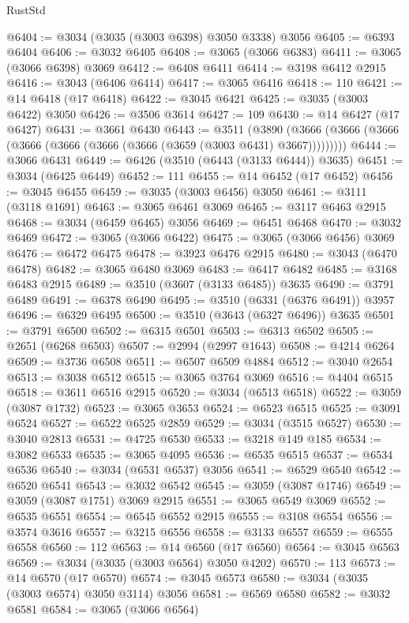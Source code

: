 \begin{lexlean}{RustStd}
\begin{coremodule}
@6404 := @3034 (@3035 (@3003 @6398) @3050 @3338) @3056
@6405 := @6393 @6404
@6406 := @3032 @6405
@6408 := @3065 (@3066 @6383)
@6411 := @3065 (@3066 @6398) @3069
@6412 := @6408 @6411
@6414 := @3198 @6412 @2915
@6416 := @3043 (@6406 @6414)
@6417 := @3065 @6416
@6418 := 110
@6421 := @14 @6418 (@17 @6418)
@6422 := @3045 @6421
@6425 := @3035 (@3003 @6422) @3050
@6426 := @3506 @3614
@6427 := 109
@6430 := @14 @6427 (@17 @6427)
@6431 := @3661 @6430
@6443 := @3511
    (@3890 (@3666 (@3666 (@3666 (@3666 (@3666 (@3666 (@3666 (@3659 (@3003 @6431) @3667)))))))))
@6444 := @3066 @6431
@6449 := @6426 (@3510 (@6443 (@3133 @6444)) @3635)
@6451 := @3034 (@6425 @6449)
@6452 := 111
@6455 := @14 @6452 (@17 @6452)
@6456 := @3045 @6455
@6459 := @3035 (@3003 @6456) @3050
@6461 := @3111 (@3118 @1691)
@6463 := @3065 @6461 @3069
@6465 := @3117 @6463 @2915
@6468 := @3034 (@6459 @6465) @3056
@6469 := @6451 @6468
@6470 := @3032 @6469
@6472 := @3065 (@3066 @6422)
@6475 := @3065 (@3066 @6456) @3069
@6476 := @6472 @6475
@6478 := @3923 @6476 @2915
@6480 := @3043 (@6470 @6478)
@6482 := @3065 @6480 @3069
@6483 := @6417 @6482
@6485 := @3168 @6483 @2915
@6489 := @3510 (@3607 (@3133 @6485)) @3635
@6490 := @3791 @6489
@6491 := @6378 @6490
@6495 := @3510 (@6331 (@6376 @6491)) @3957
@6496 := @6329 @6495
@6500 := @3510 (@3643 (@6327 @6496)) @3635
@6501 := @3791 @6500
@6502 := @6315 @6501
@6503 := @6313 @6502
@6505 := @2651 (@6268 @6503)
@6507 := @2994 (@2997 @1643)
@6508 := @4214 @6264
@6509 := @3736 @6508
@6511 := @6507 @6509 @4884
@6512 := @3040 @2654
@6513 := @3038 @6512
@6515 := @3065 @3764 @3069
@6516 := @4404 @6515
@6518 := @3611 @6516 @2915
@6520 := @3034 (@6513 @6518)
@6522 := @3059 (@3087 @1732)
@6523 := @3065 @3653
@6524 := @6523 @6515
@6525 := @3091 @6524
@6527 := @6522 @6525 @2859
@6529 := @3034 (@3515 @6527)
@6530 := @3040 @2813
@6531 := @4725 @6530
@6533 := @3218 @149 @185
@6534 := @3082 @6533
@6535 := @3065 @4095
@6536 := @6535 @6515
@6537 := @6534 @6536
@6540 := @3034 (@6531 @6537) @3056
@6541 := @6529 @6540
@6542 := @6520 @6541
@6543 := @3032 @6542
@6545 := @3059 (@3087 @1746)
@6549 := @3059 (@3087 @1751) @3069 @2915
@6551 := @3065 @6549 @3069
@6552 := @6535 @6551
@6554 := @6545 @6552 @2915
@6555 := @3108 @6554
@6556 := @3574 @3616
@6557 := @3215 @6556
@6558 := @3133 @6557
@6559 := @6555 @6558
@6560 := 112
@6563 := @14 @6560 (@17 @6560)
@6564 := @3045 @6563
@6569 := @3034 (@3035 (@3003 @6564) @3050 @4202)
@6570 := 113
@6573 := @14 @6570 (@17 @6570)
@6574 := @3045 @6573
@6580 := @3034 (@3035 (@3003 @6574) @3050 @3114) @3056
@6581 := @6569 @6580
@6582 := @3032 @6581
@6584 := @3065 (@3066 @6564)

\end{coremodule}
\end{lexlean}
